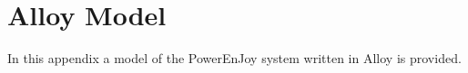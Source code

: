 \chapter{Alloy Model}
In this appendix a model of the PowerEnJoy system written in Alloy \cite{alloy} is provided.







